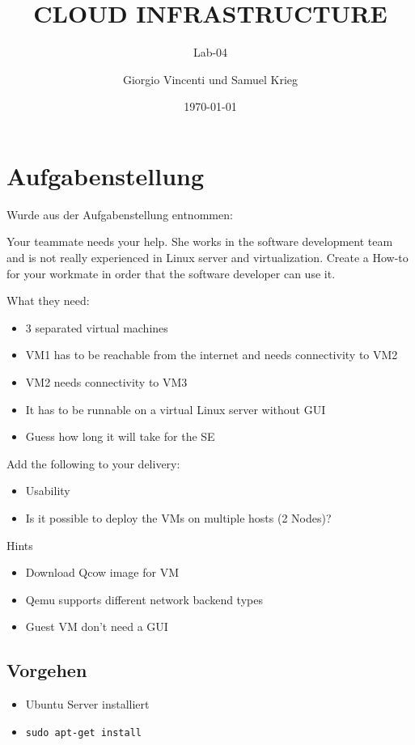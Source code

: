 \documentclass[a4,12pt]{scrartcl}
\title{CLOUD INFRASTRUCTURE}
\subtitle{Lab-04}
\author{Giorgio Vincenti und Samuel Krieg}
\date{\today}
\begin{document}
\clearpage\maketitle
\thispagestyle{empty}
\tableofcontents
\newpage

\section{Aufgabenstellung}
Wurde aus der Aufgabenstellung entnommen:

Your teammate needs your help. She works in the software development team and is not really experienced in Linux server and virtualization. Create a How-to for your workmate in order that the software developer can use it.

What they need:
\begin{itemize}
\item 3 separated virtual machines
\item  VM1 has to be reachable from the internet and needs connectivity to VM2
\item VM2 needs connectivity to VM3
\item It has to be runnable on a virtual Linux server without GUI
\item Guess how long it will take for the SE
\end{itemize}

Add the following to your delivery:
\begin{itemize}
\item Usability
\item Is it possible to deploy the VMs on multiple hosts (2 Nodes)?
\end{itemize}

Hints
\begin{itemize}
\item Download Qcow image for VM
\item Qemu supports different network backend types
\item Guest VM don’t need a GUI
\end{itemize}

\subsection{Vorgehen}
\begin{itemize}
\item Ubuntu Server installiert

\item 
\begin{lstlisting}
sudo apt-get install
\end{lstlisting}
\end{itemize}
\end{document}
